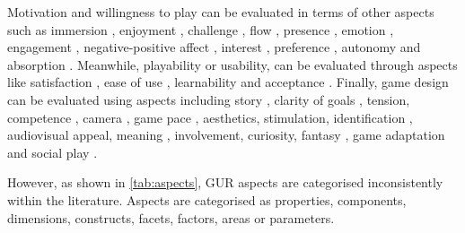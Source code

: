Motivation and willingness to play can be evaluated in terms of other aspects such as immersion \autocite{Lapas2015,Nacke2009,VandenAbeele2016,Wiemeyer2016,Nijhar2012,Sanchez2009,Desurvire2009,Nijholt2008}, enjoyment \autocite{Ho2017,Li2016,VandenAbeele2016,Zhao2016,Li2006,Berkovsky2010}, challenge \autocite{Moosajee,Nacke2009,VandenAbeele2016,Wiemeyer2016,Desurvire2009}, flow \autocite{Lapas2015,Bernhaupt2015,Nacke2009,Wiemeyer2016,Nijholt2008}, presence \autocite{Lapas2015,Mader2012,Ho2017,Wiemeyer2016}, 
emotion \autocite{Bernhaupt2015,Sanchez2009,Wiemeyer2016}, engagement \autocite{Yanez-Gomez2017,Wiemeyer2016}, negative-positive affect \autocite{Nacke2009}, interest \autocite{VandenAbeele2016}, preference \autocite{Zhao2016}, autonomy \autocite{Wiemeyer2016,VandenAbeele2016} and 
absorption \autocite{Lapas2015}. Meanwhile, playability or usability, can be evaluated through aspects like satisfaction \autocite{Yanez-Gomez2017,Zhao2016,Sanchez2009}, ease of use \autocite{Moosajee,VandenAbeele2016,Cameirao2010}, learnability \autocite{GonzalezSanchez2009,Desurvire2009} and
acceptance \autocite{Yanez-Gomez2017}. Finally, game design can be evaluated using aspects including story \autocite{Moosajee,Desurvire2009}, clarity of goals \autocite{VandenAbeele2016,Desurvire2009}, tension, competence \autocite{Wiemeyer2016,Nacke2009}, camera \autocite{Moosajee},
game pace \autocite{Moosajee,Desurvire2009}, aesthetics, stimulation, identification \autocite{Bernhaupt2015}, audiovisual appeal, meaning \autocite{VandenAbeele2016}, involvement, curiosity, fantasy \autocite{Wiemeyer2016}, game adaptation \autocite{Wiemeyer2015,Ni2014,Cameirao2010,Nijholt2008} and social play \autocite{Wiemeyer2015,Sanchez2009,Yanez-Gomez2017,Lapas2015}.

However, as shown in \autoref{tab:aspects}, \ac{GUR} aspects are categorised inconsistently within the literature. Aspects are categorised as properties, components, dimensions, constructs, facets, factors, areas or parameters.

